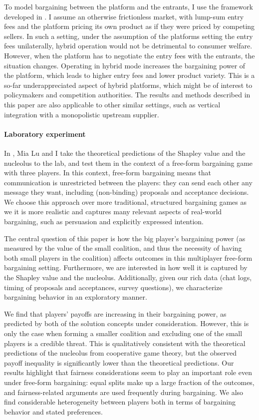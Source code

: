 To model bargaining between the platform and the entrants, I use the framework developed in .
I assume an otherwise frictionless market, with lump-sum entry fees and the platform pricing its own product as if they were priced by competing sellers.
In such a setting, under the assumption of the platforms setting the entry fees unilaterally, hybrid operation would not be detrimental to consumer welfare.
However, when the platform has to negotiate the entry fees with the entrants, the situation changes.
Operating in hybrid mode increases the bargaining power of the platform, which leads to higher entry fees and lower product variety.
This is a so-far underappreciated aspect of hybrid platforms, which might be of interest to policymakers and competition authorities.
The results and methods described in this paper are also applicable to other similar settings, such as vertical integration with a monopolistic upstream supplier.

\paragraph{Laboratory experiment}
In , Mia Lu and I take the theoretical predictions of the Shapley value and the nucleolus to the lab, and test them in the context of a free-form bargaining game with three players.
In this context, free-form bargaining means that communication is unrestricted between the players: they can send each other any message they want, including (non-binding) proposals and acceptance decisions.
We choose this approach over more traditional, structured bargaining games as we it is more realistic and captures many relevant aspects of real-world bargaining, such as persuasion and explicitly expressed intention.

The central question of this paper is how the big player's bargaining power (as measured by the value of the small coalition, and thus the necessity of having both small players in the coalition) affects outcomes in this multiplayer free-form bargaining setting.
Furthermore, we are interested in how well it is captured by the Shapley value and the nucleolus.
Additionally, given our rich data (chat logs, timing of proposals and acceptances, survey questions), we characterize bargaining behavior in an exploratory manner.

We find that players' payoffs are increasing in their bargaining power, as predicted by both of the solution concepts under consideration.
However, this is only the case when forming a smaller coalition and excluding one of the small players is a credible threat.
This is qualitatively consistent with the theoretical predictions of the nucleolus from cooperative game theory, but the observed payoff inequality is significantly lower than the theoretical predictions.
Our results highlight that fairness considerations seem to play an important role even under free-form bargaining: equal splits make up a large fraction of the outcomes, and fairness-related arguments are used frequently during bargaining.
We also find considerable heterogeneity between players both in terms of bargaining behavior and stated preferences.
